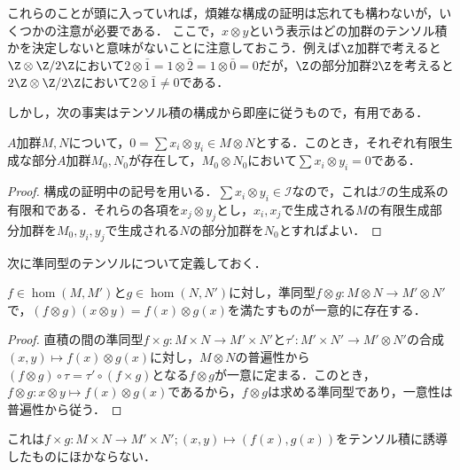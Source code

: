 これらのことが頭に入っていれば，煩雑な構成の証明は忘れても構わないが，いくつかの注意が必要である．
ここで，$x\otimes y$という表示はどの加群のテンソル積かを決定しないと意味がないことに注意しておこう．例えば$\Z$加群で考えると $\Z\otimes \Z/2\Z$において$2\otimes\bar{1}=1\otimes\bar{2}=1\otimes\bar{0}=0$だが，$\Z$の部分加群$2\Z$を考えると$2\Z\otimes\Z/2\Z$において$2\otimes\bar{1}\neq0$である．

しかし，次の事実はテンソル積の構成から即座に従うもので，有用である．

\begin{prop}\label{prop:テンソルの有限生成への制限}
	$A$加群$M,N$について，$0=\sum x_i\otimes y_i\in M\otimes N$とする．このとき，それぞれ有限生成な部分$A$加群$M_0,N_0$が存在して，$M_0\otimes N_0$において$\sum x_i\otimes y_i=0$である．
\end{prop}

\begin{proof}
	構成の証明中の記号を用いる．$\sum x_i\otimes y_i\in\mathcal{I}$なので，これは$\mathcal{I}$の生成系の有限和である．それらの各項を$x_j\otimes y_j$とし，$x_i,x_j$で生成される$M$の有限生成部分加群を$M_0,y_i,y_j$で生成される$N$の部分加群を$N_0$とすればよい．
\end{proof}

次に準同型のテンソルについて定義しておく．

\begin{prop}
	$f\in\hom(M,M')$と$g\in\hom(N,N')$に対し，準同型$f\otimes g:M\otimes N\to M'\otimes N'$で，$(f\otimes g)(x\otimes y)=f(x)\otimes g(x)$を満たすものが一意的に存在する．
\end{prop}
\begin{proof}
	直積の間の準同型$f\times g:M\times N\to M'\times N'$と$\tau':M'\times N'\to M'\otimes N'$の合成$(x,y)\mapsto f(x)\otimes g(x)$に対し，$M\otimes N$の普遍性から$(f\otimes g)\circ\tau=\tau'\circ(f\times g)$となる$f\otimes g$が一意に定まる．このとき，$f\otimes g:x\otimes y\mapsto f(x)\otimes g(x)$であるから，$f\otimes g$は求める準同型であり，一意性は普遍性から従う．
\end{proof}
これは$f\times g:M\times N\to M'\times N';(x,y)\mapsto (f(x),g(x))$をテンソル積に誘導したものにほかならない．

